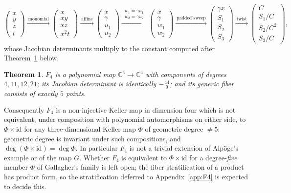 \documentclass[11pt]{article}
\theoremstyle{plain}
\newtheorem{theorem}{Theorem}[section]
\theoremstyle{definition}
\theoremstyle{remark}
\newcommand{\C}{\mathbb{C}}
\begin{document}
\[
\begin{pmatrix}x\\ y\\ z\\ t\end{pmatrix}
\xrightarrow{\ \text{monomial}\ }
\begin{pmatrix}x\\ xy\\ xz\\ x^2t\end{pmatrix}
\xrightarrow{\ \text{affine}\ }
\begin{pmatrix}x\\ \gamma\\ u_1\\ u_2\end{pmatrix}
\xrightarrow{\ \substack{w_1=\gamma u_1\\[1pt] w_2=\gamma u_2}\ }
\begin{pmatrix}x\\ \gamma\\ w_1\\ w_2\end{pmatrix}
\xrightarrow{\ \text{padded sweep}\ }
\begin{pmatrix}\gamma x\\ S_1\\ S_2\\ S_3\end{pmatrix}
\xrightarrow{\ \text{twist}\ }
\begin{pmatrix}C\\ S_1/C\\ S_2/C^2\\ S_3/C\end{pmatrix},
\]
whose Jacobian determinants multiply to the constant computed after
Theorem~\ref{thm:F4} below.

\begin{theorem}\label{thm:F4}
$F_4$ is a polynomial map $\C^4\to\C^4$ with components of degrees $4,11,12,21$;
its Jacobian determinant is identically $-\tfrac{44}{9}$; and its generic fiber
consists of exactly $5$ points.
\end{theorem}

Consequently $F_4$ is a non-injective Keller map
in dimension four which is not equivalent, under composition with polynomial
automorphisms on either side, to $\Phi\times\mathrm{id}$ for any
three-dimensional Keller map $\Phi$ of geometric degree $\neq5$: geometric degree
is invariant under such compositions, and $\deg(\Phi\times\mathrm{id})
=\deg\Phi$. In particular $F_4$ is not a trivial extension of Alp\"oge's example
or of the map $G$. Whether $F_4$ is equivalent to $\Phi\times\mathrm{id}$ for a
degree-\emph{five} member $\Phi$ of Gallagher's family \cite{Gallagher2026} is
left open; the fiber stratification of a product has product form, so the
stratification deferred to Appendix~\ref{app:F4} is expected to decide this.
\end{document}
